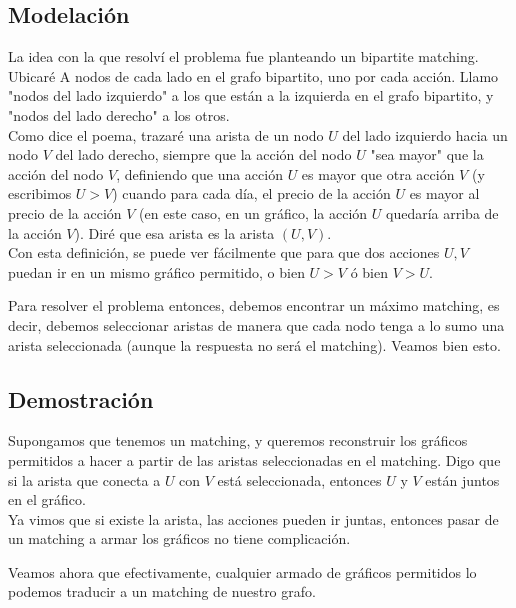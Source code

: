 \documentclass[a4paper]{article}
\begin{document}
\subsection{Modelación} 

La idea con la que resolví el problema fue planteando un bipartite matching.
Ubicaré A nodos de cada lado en el grafo bipartito, uno por cada acción. Llamo "nodos del lado izquierdo" a los que están a la izquierda en el grafo bipartito, y "nodos del lado derecho" a los otros. \\
Como dice el poema, trazaré una arista de un nodo $U$ del lado izquierdo hacia un nodo $V$ del lado derecho, siempre que la acción del nodo $U$ "sea mayor" que la acción del nodo $V$, definiendo que una acción $U$ es mayor que otra acción $V$ (y escribimos $U>V$) cuando para cada día, el precio de la acción $U$ es mayor al precio de la acción $V$ (en este caso, en un gráfico, la acción $U$ quedaría arriba de la acción $V$). Diré que esa arista es la arista $(U, V)$.\\
Con esta definición, se puede ver fácilmente que para que dos acciones $U, V$ puedan ir en un mismo gráfico permitido, o bien $U>V$ ó bien $V>U$.

Para resolver el problema entonces, debemos encontrar un máximo matching, es decir, debemos seleccionar aristas de manera que cada nodo tenga a lo sumo una arista seleccionada (aunque la respuesta no será el matching). Veamos bien esto.

\newpage
\subsection{Demostración} 

Supongamos que tenemos un matching, y queremos reconstruir los gráficos permitidos a hacer a partir de las aristas seleccionadas en el matching.
Digo que si la arista que conecta a $U$ con $V$ está seleccionada, entonces $U$ y $V$ están juntos en el gráfico.\\

Ya vimos que si existe la arista, las acciones pueden ir juntas, entonces pasar de un matching a armar los gráficos no tiene complicación.

Veamos ahora que efectivamente, cualquier armado de gráficos permitidos lo podemos traducir a un matching de nuestro grafo.
\end{document}
